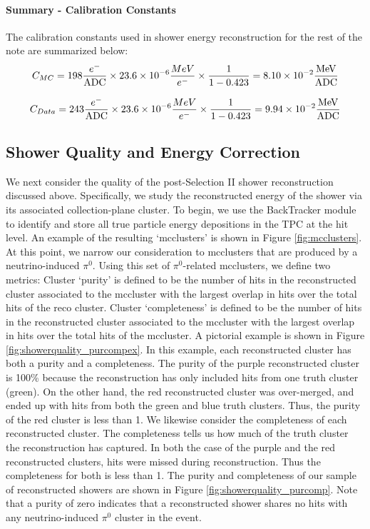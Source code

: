 \paragraph{Summary - Calibration Constants}
The calibration constants used in shower energy reconstruction for the rest of the note are summarized below:
\begin{equation}
  C_{MC} = 198 \frac{e^-}{\rm ADC} \times 23.6 \times 10^{-6} \frac{MeV}{e^-} \times \frac{1}{1-0.423} = 8.10 \times 10^{-2} \frac{\rm MeV}{\rm ADC}
\end{equation}

\begin{equation}
  C_{Data} = 243 \frac{e^-}{\rm ADC} \times 23.6 \times 10^{-6} \frac{MeV}{e^-} \times \frac{1}{1-0.423} = 9.94 \times 10^{-2} \frac{\rm MeV}{\rm ADC}
\end{equation}


\subsection{Shower Quality and Energy Correction}
We next consider the quality of the post-Selection II shower reconstruction discussed above.  Specifically, we study the reconstructed energy of the shower via its associated collection-plane cluster. To begin, we use the BackTracker module to identify and store all true particle energy depositions in the TPC at the hit level.  An example of the resulting `mcclusters' is shown in Figure \ref{fig:mcclusters}. At this point, we narrow our consideration to mcclusters that are produced by a neutrino-induced $\pi^0$. Using this set of $\pi^0$-related mcclusters, we define two metrics: Cluster `purity' is defined to be the number of hits in the reconstructed cluster associated to the mccluster with the largest overlap in hits over the total hits of the reco cluster. Cluster `completeness' is defined to be the number of hits in the reconstructed cluster associated to the mccluster with the largest overlap in hits over the total hits of the mccluster. A pictorial example is shown in Figure \ref{fig:showerquality_purcompex}. In this example, each reconstructed cluster has both a purity and a completeness.  The purity of the purple reconstructed cluster is 100\% because the reconstruction has only included hits from one truth cluster (green). On the other hand, the red reconstructed cluster was over-merged, and ended up with hits from both the green and blue truth clusters.  Thus, the purity of the red cluster is less than 1. We likewise consider the completeness of each reconstructed cluster. The completeness tells us how much of the truth cluster the reconstruction has captured.  In both the case of the purple and the red reconstructed clusters, hits were missed during reconstruction. Thus the completeness for both is less than 1.  The purity and completeness of our sample of reconstructed showers are shown in Figure \ref{fig:showerquality_purcomp}. Note that a purity of zero indicates that a reconstructed shower shares no hits with any neutrino-induced $\pi^0$ cluster in the event. 

